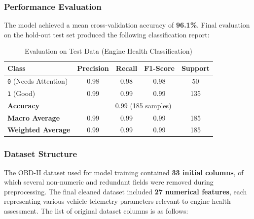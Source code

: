 \begin{enumerate}
\subsubsection*{Performance Evaluation}

The model achieved a mean cross-validation accuracy of \textbf{96.1\%}. Final evaluation on the hold-out test set produced the following classification report:

\begin{table}[H]
    \centering
    \caption{Evaluation on Test Data (Engine Health Classification)}
    \label{tab:engine_health_evaluation_new}
    \begin{tabular}{|l|c|c|c|c|}
        \hline
        \textbf{Class} & \textbf{Precision} & \textbf{Recall} & \textbf{F1-Score} & \textbf{Support} \\
        \hline
        \texttt{0} (Needs Attention) & 0.98 & 0.98 & 0.98 & 50 \\
        \texttt{1} (Good)             & 0.99 & 0.99 & 0.99 & 135 \\
        \hline
        \textbf{Accuracy}              & \multicolumn{4}{|c|}{0.99 (185 samples)} \\
        \hline
        \textbf{Macro Average}         & 0.99 & 0.99 & 0.99 & 185 \\
        \hline
        \textbf{Weighted Average}      & 0.99 & 0.99 & 0.99 & 185 \\
        \hline
    \end{tabular}
\end{table}

\subsubsection*{Dataset Structure}

The OBD-II dataset used for model training contained \textbf{33 initial columns}, of which several non-numeric and redundant fields were removed during preprocessing. The final cleaned dataset included \textbf{27 numerical features}, each representing various vehicle telemetry parameters relevant to engine health assessment. The list of original dataset columns is as follows:


\end{enumerate}
